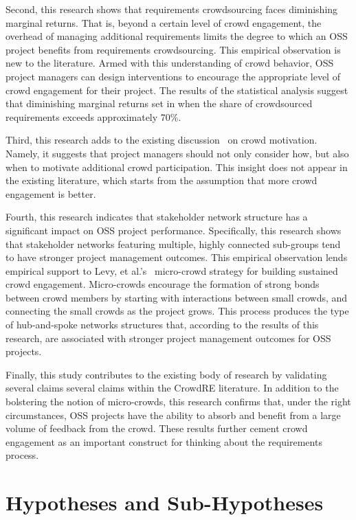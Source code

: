 Second, this research shows that requirements crowdsourcing faces diminishing marginal returns. That is, beyond a certain level of crowd engagement, the overhead of managing additional requirements limits the degree to which an OSS project benefits from requirements crowdsourcing. This empirical observation is new to the literature. Armed with this understanding of crowd behavior, OSS project managers can design interventions to encourage the appropriate level of crowd engagement for their project. The results of the statistical analysis suggest that diminishing marginal returns set in when the share of crowdsourced requirements exceeds approximately 70\%. 

Third, this research adds to the existing discussion~\cite{groen, levy, hosseini, snijders, snijders2} on crowd motivation. Namely, it suggests that project managers should not only consider how, but also when to motivate additional crowd participation. This insight does not appear in the existing literature, which starts from the assumption that more crowd engagement is better.

Fourth, this research indicates that stakeholder network structure has a significant impact on OSS project performance. Specifically, this research shows that stakeholder networks featuring multiple, highly connected sub-groups tend to have stronger project management outcomes. This empirical observation lends empirical support to Levy, et al.'s~\cite{levy} micro-crowd strategy for building sustained crowd engagement. Micro-crowds encourage the formation of strong bonds between crowd members by starting with interactions between small crowds, and connecting the small crowds as the project grows. This process produces the type of hub-and-spoke networks structures that, according to the results of this research, are associated with stronger project management outcomes for OSS projects.

Finally, this study contributes to the existing body of research by validating several claims several claims within the CrowdRE literature. In addition to the bolstering the notion of micro-crowds, this research confirms that, under the right circumstances, OSS projects have the ability to absorb and benefit from a large volume of feedback from the crowd. These results further cement crowd engagement as an important construct for thinking about the requirements process.

\section{Hypotheses and Sub-Hypotheses}

